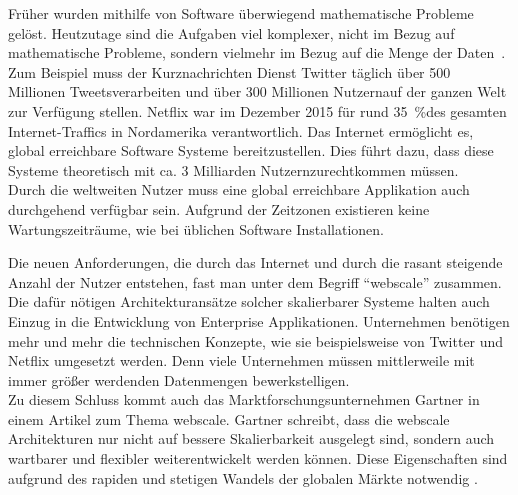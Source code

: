 Früher wurden mithilfe von Software überwiegend mathematische Probleme gelöst. Heutzutage sind die Aufgaben viel komplexer, nicht im Bezug auf mathematische Probleme, sondern vielmehr im Bezug auf die Menge der Daten~\cite[S.~18]{kuhn_reactive_2015}. Zum Beispiel muss der Kurznachrichten Dienst Twitter täglich über 500 Millionen Tweets\footnotemark[1] verarbeiten und über 300 Millionen Nutzern\footnotemark[2] auf der ganzen Welt zur Verfügung stellen. Netflix war im Dezember 2015 für rund 35~\%\footnotemark[3] des gesamten Internet-Traffics in Nordamerika verantwortlich. Das Internet ermöglicht es, global erreichbare Software Systeme bereitzustellen. Dies führt dazu, dass diese Systeme theoretisch mit ca. 3 Milliarden Nutzern\footnotemark[4] zurechtkommen müssen.\\
Durch die weltweiten Nutzer muss eine global erreichbare Applikation auch durchgehend verfügbar sein. Aufgrund der Zeitzonen existieren keine Wartungszeiträume, wie bei üblichen Software Installationen.


\pagebreak

Die neuen Anforderungen, die durch das Internet und durch die rasant steigende Anzahl der Nutzer entstehen, fast man unter dem Begriff \enquote{\gls{webscale}} zusammen. Die dafür nötigen Architekturansätze solcher skalierbarer Systeme halten auch Einzug in die Entwicklung von Enterprise Applikationen. Unternehmen benötigen mehr und mehr die technischen Konzepte, wie sie beispielsweise von Twitter und Netflix umgesetzt werden. Denn viele Unternehmen müssen mittlerweile mit immer größer werdenden Datenmengen bewerkstelligen.\\
Zu diesem Schluss kommt auch das Marktforschungsunternehmen Gartner in einem Artikel zum Thema \gls{webscale}. Gartner schreibt, dass die \gls{webscale} Architekturen nur nicht auf bessere Skalierbarkeit ausgelegt sind, sondern auch wartbarer und flexibler weiterentwickelt werden können. Diese Eigenschaften sind aufgrund des rapiden und stetigen Wandels der globalen Märkte notwendig \cite{van_der_meulen_gartner_2014}.\\

